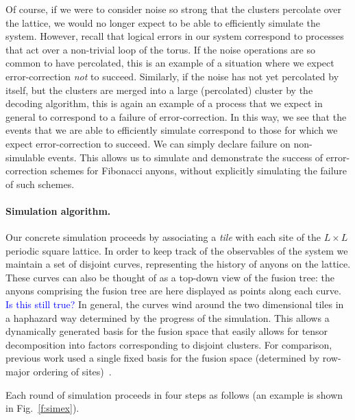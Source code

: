 \documentclass[aps, prl, letterpaper, twocolumn, superscriptaddress, notitlepage, 10pt]{revtex4-1}
\newcommand{\Fref}[1]{Fig.~\ref{#1}}
\newcommand{\cggb}[1]{\textcolor{blue}{#1}}
\begin{document}
Of course, if we were to consider noise so strong that the clusters percolate over the lattice, 
we would no longer expect to be able to efficiently simulate the system. However, recall that logical 
errors in our system correspond to processes that act over a non-trivial loop of the torus. If 
the noise operations are so common to have percolated, this is an example of a situation 
where we expect error-correction \emph{not} to succeed. Similarly, if the noise has not yet 
percolated by itself, but the clusters are merged into a large (percolated) cluster by the 
decoding algorithm, this is again an example of a process that we expect in general to correspond to a 
failure of error-correction. In this way, we see that the events that we are able to efficiently 
simulate correspond to those for which we expect error-correction to succeed. We 
can simply declare failure on non-simulable events. This allows us to simulate and 
demonstrate the success of error-correction schemes for Fibonacci anyons, without explicitly 
simulating the failure of such schemes.

\paragraph{Simulation algorithm.}

Our concrete simulation proceeds by associating a \emph{tile} with each site of the 
$L\times L$ periodic square lattice.
In order to keep track of the observables of the system 
we maintain a set of disjoint curves, representing the history of anyons on the lattice.
These curves can also be thought of as a top-down view of the fusion tree:
the anyons comprising the fusion tree are here displayed as points along each curve. \cggb{Is this still true?}
In general, the curves wind around the two 
dimensional tiles in a haphazard way determined by the progress of the simulation.
This allows a dynamically generated basis for the fusion space that easily allows for tensor 
decomposition into factors corresponding to disjoint clusters.
For comparison, previous work 
used a single fixed basis for the fusion space (determined by row-major ordering of 
sites)~\cite{Brell2013}.

Each round of simulation proceeds in four steps as follows (an example is shown 
in \Fref{f:simex}).
\end{document}
